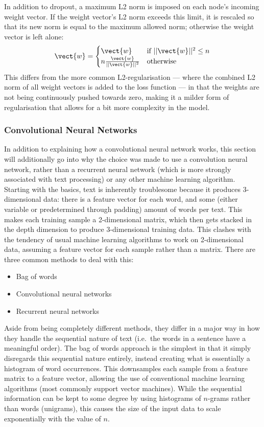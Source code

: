 In addition to dropout, a maximum L2 norm is imposed on each node's incoming
weight vector. If the weight vector's L2 norm exceeds this limit, it is rescaled
so that its new norm is equal to the maximum allowed norm; otherwise the weight
vector is left alone:
\begin{equation}
  \label{eq:norm}
  \vect{w} = \begin{cases}
    \vect{w}\,                          & \text{if } ||\vect{w}||^2 \leq n \\
    n \frac{\vect{w}}{||\vect{w}||^2} & \text{otherwise}
  \end{cases}
\end{equation}
This differs from the more common L2-regularisation --- where the combined L2
norm of all weight vectors is added to the loss function --- in that the weights
are not being continuously pushed towards zero, making it a milder form of
regularisation that allows for a bit more complexity in the model.

\subsubsection{Convolutional Neural Networks}\label{sec:conv}
In addition to explaining how a convolutional neural network works, this section
will additionally go into why the choice was made to use a convolution neural
network, rather than a recurrent neural network (which is more strongly
associated with text processing) or any other machine learning algorithm.
Starting with the basics, text is inherently troublesome because it produces
3-dimensional data: there is a feature vector for each word, and some (either
variable or predetermined through padding) amount of words per text. This makes
each training sample a 2-dimensional matrix, which then gets stacked in the
depth dimension to produce 3-dimensional training data. This clashes with the
tendency of usual machine learning algorithms to work on 2-dimensional data,
assuming a feature vector for each sample rather than a matrix. There are three
common methods to deal with this:
\begin{itemize}
\item Bag of words
\item Convolutional neural networks
\item Recurrent neural networks
\end{itemize}

Aside from being completely different methods, they differ in a major way in how
they handle the sequential nature of text (i.e.\ the words in a sentence have a
meaningful order). The bag of words approach is the
simplest in that it simply disregards this sequential nature entirely, instead creating
what is essentially a histogram of word occurrences. This downsamples each
sample from a feature matrix to a feature vector, allowing the use of
conventional machine learning algorithms (most commonly support vector
machines). While the sequential information can be kept to some degree by using
histograms of $n$-grams rather than words (unigrams), this causes the size of
the input data to scale exponentially with the value of $n$.

